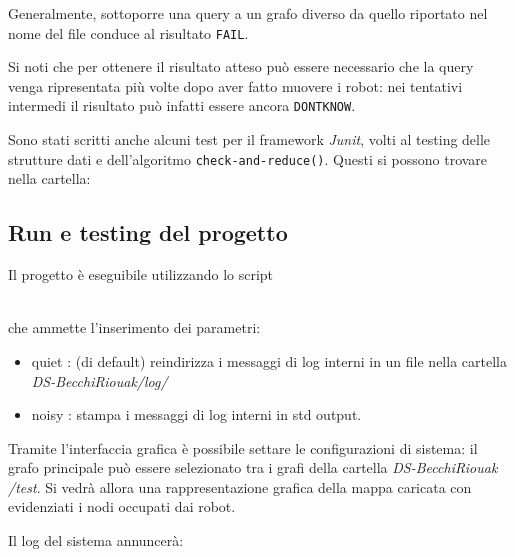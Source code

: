 Generalmente, sottoporre una query a un grafo diverso da quello riportato
nel nome del file conduce al risultato \texttt{FAIL}.

Si noti che per ottenere il risultato atteso può essere necessario
che la query venga ripresentata più volte dopo aver fatto muovere i robot:
nei tentativi intermedi il risultato può infatti essere ancora \texttt{DONTKNOW}.

Sono stati scritti anche alcuni test per il framework \emph{Junit}, volti al
testing delle strutture dati e dell'algoritmo \texttt{check-and-reduce()}.
Questi si possono trovare nella cartella:\\

\subsection{Run e testing del progetto}
Il progetto è eseguibile utilizzando lo script


\\
che ammette l'inserimento dei parametri:
\begin{itemize}
\item quiet : (di default) reindirizza i messaggi di log interni in un file nella
  cartella \emph{DS-BecchiRiouak/log/ }
\item noisy : stampa i messaggi di log interni in std output.
\end{itemize}

Tramite l'interfaccia grafica è possibile settare le configurazioni di sistema:
il grafo principale può essere selezionato tra i grafi della cartella
\emph{DS-BecchiRiouak /test}.
Si vedrà allora una rappresentazione grafica della mappa caricata con
evidenziati i nodi occupati dai robot.

Il log del sistema annuncerà:




